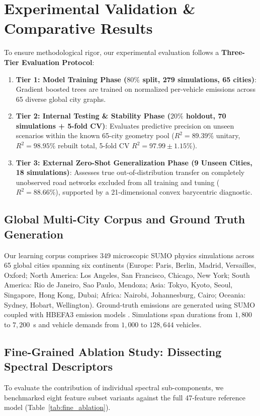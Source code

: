 \documentclass[journal]{IEEEtran}
\begin{document}
\section{Experimental Validation \& Comparative Results}

To ensure methodological rigor, our experimental evaluation follows a \textbf{Three-Tier Evaluation Protocol}:
\begin{enumerate}
    \item \textbf{Tier 1: Model Training Phase ($80\%$ split, 279 simulations, 65 cities)}: Gradient boosted trees are trained on normalized per-vehicle emissions across 65 diverse global city graphs.
    \item \textbf{Tier 2: Internal Testing \& Stability Phase ($20\%$ holdout, 70 simulations + 5-fold CV)}: Evaluates predictive precision on unseen scenarios within the known 65-city geometry pool ($R^2 = 89.39\%$ unitary, $R^2 = 98.95\%$ rebuilt total, 5-fold CV $R^2 = 97.99 \pm 1.15\%$).
    \item \textbf{Tier 3: External Zero-Shot Generalization Phase (9 Unseen Cities, 18 simulations)}: Assesses true out-of-distribution transfer on completely unobserved road networks excluded from all training and tuning ($R^2 = 88.66\%$), supported by a 21-dimensional convex barycentric diagnostic.
\end{enumerate}

\subsection{Global Multi-City Corpus and Ground Truth Generation}
Our learning corpus comprises 349 microscopic SUMO physics simulations across 65 global cities spanning six continents (Europe: Paris, Berlin, Madrid, Versailles, Oxford; North America: Los Angeles, San Francisco, Chicago, New York; South America: Rio de Janeiro, Sao Paulo, Mendoza; Asia: Tokyo, Kyoto, Seoul, Singapore, Hong Kong, Dubai; Africa: Nairobi, Johannesburg, Cairo; Oceania: Sydney, Hobart, Wellington). Ground-truth emissions are generated using SUMO coupled with HBEFA3 emission models \cite{Krajzewicz2012, Kratzsch2020}. Simulations span durations from $1,800$ to $7,200$~s and vehicle demands from $1,000$ to $128,644$ vehicles.

\subsection{Fine-Grained Ablation Study: Dissecting Spectral Descriptors}
To evaluate the contribution of individual spectral sub-components, we benchmarked eight feature subset variants against the full 47-feature reference model (Table~\ref{tab:fine_ablation}).
\end{document}
